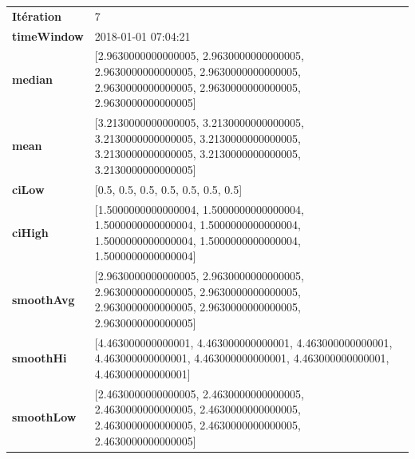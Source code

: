 \begin{table}[H]
	\centering
	\begin{tabularx}{\textwidth}{lX}
		\textbf{Itération}& 7\\
		\textbf{timeWindow}	 &  2018-01-01 07:04:21 \\
		\textbf{median} & [2.9630000000000005, 2.9630000000000005, 2.9630000000000005, 2.9630000000000005, 2.9630000000000005, 2.9630000000000005, 2.9630000000000005] 
		\\ 
		\textbf{mean} & [3.2130000000000005, 3.2130000000000005, 3.2130000000000005, 3.2130000000000005, 3.2130000000000005, 3.2130000000000005, 3.2130000000000005] 
		\\
		\textbf{ciLow} & [0.5, 0.5, 0.5, 0.5, 0.5, 0.5, 0.5]  \\
		\textbf{ciHigh}& [1.5000000000000004, 1.5000000000000004, 1.5000000000000004, 1.5000000000000004, 1.5000000000000004, 1.5000000000000004, 1.5000000000000004] \\
		\textbf{smoothAvg} & [2.9630000000000005, 2.9630000000000005, 2.9630000000000005, 2.9630000000000005, 2.9630000000000005, 2.9630000000000005, 2.9630000000000005]  \\
		\textbf{smoothHi} & [4.463000000000001, 4.463000000000001, 4.463000000000001, 4.463000000000001, 4.463000000000001, 4.463000000000001, 4.463000000000001] \\
		\textbf{smoothLow} & [2.4630000000000005, 2.4630000000000005, 2.4630000000000005, 2.4630000000000005, 2.4630000000000005, 2.4630000000000005, 2.4630000000000005]\\ 
	\end{tabularx} 
\end{table}

